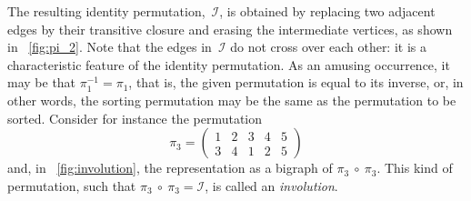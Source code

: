 The resulting identity permutation,~\(\mathcal{I}\), is obtained by
replacing two adjacent edges by their transitive closure and erasing
the intermediate vertices, as shown in \fig~\vref{fig:pi_2}. Note that
the edges in~\(\mathcal{I}\) do not cross over each other: it is a
characteristic feature of the identity permutation. As an amusing
occurrence, it may be that \(\pi_1^{-1} = \pi_1\), that is, the given
permutation is equal to its inverse, or, in other words, the sorting
permutation may be the same as the permutation to be sorted. Consider
for instance the permutation
\[
\pi_3 =
\begin{pmatrix}
1 & 2 & 3 & 4 & 5\\
3 & 4 & 1 & 2 & 5
\end{pmatrix}
\]
and, in \fig~\vref{fig:involution}, the representation as a bigraph of
\(\pi_3~\circ~\pi_3\). This kind of permutation, such that
\(\pi_3~\circ~\pi_3 = \mathcal{I}\), is called an \emph{involution}.

